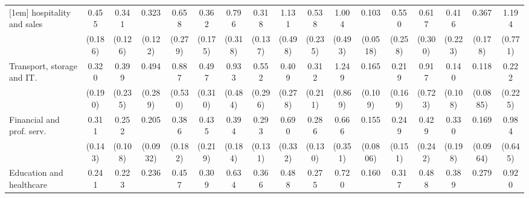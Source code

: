 {\begin{tabular}{l*{16}{c}}
[1em]
hospitality and sales&       0.455         &       0.341\sym{**} &       0.323\sym{**} &       0.658         &       0.362\sym{*}  &       0.796         &       0.318\sym{**} &       1.131         &       0.538         &       1.004         &       0.103\sym{***}&       0.550         &       0.617         &       0.416         &       0.367\sym{*}  &       1.194         \\
                    &     (0.186)         &     (0.126)         &     (0.122)         &     (0.279)         &     (0.175)         &     (0.318)         &     (0.137)         &     (0.498)         &     (0.235)         &     (0.493)         &    (0.0518)         &     (0.258)         &     (0.300)         &     (0.223)         &     (0.178)         &     (0.771)         \\
[1em]
Transport, storage and IT.&       0.320         &       0.399         &       0.494         &       0.887         &       0.497         &       0.933         &       0.552         &       0.409         &       0.312         &       1.249         &       0.165\sym{**} &       0.219\sym{*}  &       0.917         &       0.140\sym{*}  &       0.118\sym{**} &       0.222         \\
                    &     (0.190)         &     (0.235)         &     (0.289)         &     (0.530)         &     (0.310)         &     (0.484)         &     (0.296)         &     (0.278)         &     (0.211)         &     (0.869)         &     (0.109)         &     (0.169)         &     (0.723)         &     (0.108)         &    (0.0885)         &     (0.225)         \\
[1em]
Financial and prof. serv.&       0.311\sym{*}  &       0.252\sym{**} &       0.205\sym{***}&       0.386\sym{*}  &       0.435         &       0.394\sym{*}  &       0.293\sym{**} &       0.690         &       0.286\sym{**} &       0.666         &       0.155\sym{***}&       0.249\sym{*}  &       0.429         &       0.330         &       0.169\sym{**} &       0.984         \\
                    &     (0.143)         &     (0.108)         &    (0.0932)         &     (0.182)         &     (0.219)         &     (0.184)         &     (0.131)         &     (0.332)         &     (0.130)         &     (0.351)         &    (0.0806)         &     (0.151)         &     (0.242)         &     (0.198)         &    (0.0964)         &     (0.645)         \\
[1em]
Education and healthcare&       0.241\sym{**} &       0.223\sym{***}&       0.236\sym{***}&       0.457         &       0.309\sym{*}  &       0.634         &       0.366\sym{*}  &       0.488         &       0.275\sym{**} &       0.720         &       0.160\sym{***}&       0.317\sym{*}  &       0.488         &       0.389         &       0.279\sym{*}  &       0.920         \\

\end{tabular}}
